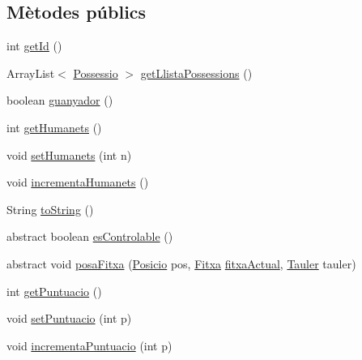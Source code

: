 \subsection*{Mètodes públics}
\begin{DoxyCompactItemize}
\item 
int \mbox{\hyperlink{class_jugador_a94e3e666866e80e3a47fead1195de821}{get\+Id}} ()
\item 
Array\+List$<$ \mbox{\hyperlink{class_possessio}{Possessio}} $>$ \mbox{\hyperlink{class_jugador_a911338c762d6a518ec628a6fde94ab5b}{get\+Llista\+Possessions}} ()
\item 
boolean \mbox{\hyperlink{class_jugador_ae09056db510ac7461366abd9774754f9}{guanyador}} ()
\item 
int \mbox{\hyperlink{class_jugador_a07a0c155b480c9822ae8cf6b8649f688}{get\+Humanets}} ()
\item 
void \mbox{\hyperlink{class_jugador_a0fb22c0823337850e57c0efb5dd54aff}{set\+Humanets}} (int n)
\item 
void \mbox{\hyperlink{class_jugador_a2338c2d33521058c2d9d2804c2e481f4}{incrementa\+Humanets}} ()
\item 
String \mbox{\hyperlink{class_jugador_a69e46d6ddf4397e9325d4cdec5bb4253}{to\+String}} ()
\item 
abstract boolean \mbox{\hyperlink{class_jugador_a35b3082524dca77c1a666d31358bf520}{es\+Controlable}} ()
\item 
abstract void \mbox{\hyperlink{class_jugador_ae014826953f1629afbf0a19787aadfe0}{posa\+Fitxa}} (\mbox{\hyperlink{class_posicio}{Posicio}} pos, \mbox{\hyperlink{class_fitxa}{Fitxa}} \mbox{\hyperlink{class_jugador_a221c891bd7f14049abe513c2705ac5bc}{fitxa\+Actual}}, \mbox{\hyperlink{class_tauler}{Tauler}} tauler)
\item 
int \mbox{\hyperlink{class_jugador_a495f4c17e7ead8bf4be596e6fe28fbe8}{get\+Puntuacio}} ()
\item 
void \mbox{\hyperlink{class_jugador_a9b4f91f35c48eda851a622666c1b93d5}{set\+Puntuacio}} (int p)
\item 
void \mbox{\hyperlink{class_jugador_a38bda447d8645686d11c49814dd31fe3}{incrementa\+Puntuacio}} (int p)
\end{DoxyCompactItemize}
